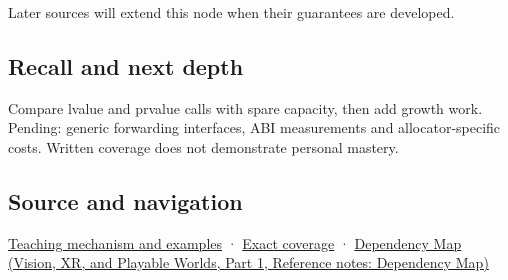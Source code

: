 \hypertarget{appendix-d5908f75721f-used-by}{}

Later sources will extend this node when their guarantees are developed.

\subsection{Recall and next depth}\label{appendix-d5908f75721f-recall-and-next-depth}

\hypertarget{appendix-d5908f75721f-recall-and-next-depth}{}

Compare lvalue and prvalue calls with spare capacity, then add growth work. Pending: generic forwarding interfaces, ABI measurements and allocator-specific costs. Written coverage does not demonstrate personal mastery.

\subsection{Source and navigation}\label{appendix-d5908f75721f-source-and-navigation}

\hypertarget{appendix-d5908f75721f-source-and-navigation}{}

\hyperref[01-foundations-i-ch003-a-value-crosses-the-function-boundary]{Teaching mechanism and examples} · \hyperref[appendix-fd090d982a15-m009---parts-127-147]{Exact coverage} · \href{../07-Vision-XR-and-Playable-Worlds-P01/main.pdf\#nameddest=appendix-4ad47bdd269a}{Dependency Map (Vision, XR, and Playable Worlds, Part 1, Reference notes: Dependency Map)}
